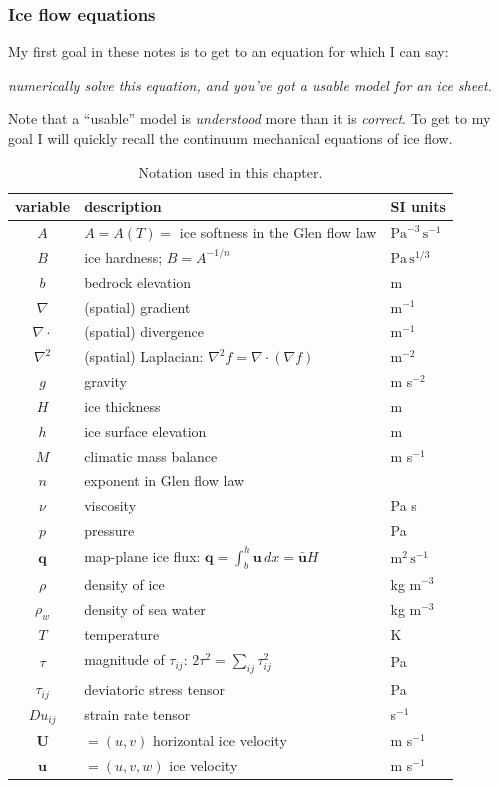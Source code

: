 \documentclass[titlepage,letterpaper,final,12pt]{scrartcl}
\newcommand{\bq}{\mathbf{q}}
\begin{document}
\subsubsection*{Ice flow equations}  My first goal in these notes is to get to an equation for which I can say:
\begin{center}
\emph{numerically solve this equation, and you've got a usable model for an ice sheet.}
\end{center}
Note that a ``usable'' model is \emph{understood} more than it is \emph{correct}.  To get to my goal I will quickly recall the continuum mechanical equations of ice flow.  

\begin{table}%
\caption{Notation used in this chapter.}
\label{tab:notation}
\begin{tabular}{cll}
variable  & description & SI units \\ 
\hline
$A$ & $A=A(T)=$ ice softness in the Glen flow law & $\text{Pa}^{-3}\,\text{s}^{-1}$ \\
$B$ & ice hardness; $B=A^{-1/n}$ & $\text{Pa}\,\text{s}^{1/3}$ \\
$b$ & bedrock elevation & m \\
$\nabla$ & (spatial) gradient & m$^{-1}$ \\
$\nabla\cdot$ & (spatial) divergence & m$^{-1}$ \\
$\nabla^2$ & (spatial) Laplacian: $\nabla^2 f = \nabla\cdot(\nabla f)$ & m$^{-2}$ \\
$g$ & gravity & m s$^{-2}$ \\
$H$ & ice thickness & m \\
$h$ & ice surface elevation & m \\
$M$ & climatic mass balance & m s$^{-1}$ \\
$n$ & exponent in Glen flow law & \\
$\nu$ & viscosity & Pa s \\
$p$ & pressure & Pa \\
$\bq$ & map-plane ice flux: $\bq = \int_{b}^{h} \mathbf{u}\,dx = \bar{\mathbf{u}} H$ & $\text{m}^2\,\text{s}^{-1}$ \\
$\rho$ & density of ice & kg m$^{-3}$ \\
$\rho_w$ & density of sea water & kg m$^{-3}$ \\
$T$ & temperature & K \\
$\tau$ & magnitude of $\tau_{ij}$: $2 \tau^2 = \sum_{ij} \tau_{ij}^2$ & Pa \\
$\tau_{ij}$ & deviatoric stress tensor & Pa \\
$Du_{ij}$ & strain rate tensor & s$^{-1}$ \\
$\mathbf{U}$ & $=(u,v)$ horizontal ice velocity & m s$^{-1}$ \\
$\mathbf{u}$ & $=(u,v,w)$ ice velocity & m s$^{-1}$ \\
\end{tabular}
\end{table}
\end{document}
